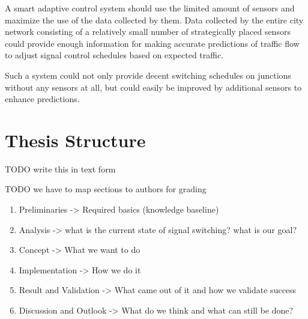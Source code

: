 A smart adaptive control system should use the limited amount of sensors and maximize the use of the data collected by them. Data collected by the entire city network consisting of a relatively small number of strategically placed sensors could provide enough information for making accurate predictions of traffic flow to adjust signal control schedules based on expected traffic.

Such a system could not only provide decent switching schedules on junctions without any sensors at all, but could easily be improved by additional sensors to enhance predictions.

\newpage

\section{Thesis Structure}

TODO write this in text form

TODO we have to map sections to authors for grading


\begin{enumerate}
	\item Preliminaries -> Required basics (knowledge baseline)
	\item Analysis -> what is the current state of signal switching? what is our goal?
	\item Concept -> What we want to do
	\item Implementation -> How we do it
	\item Result and Validation -> What came out of it and how we validate success
	\item Discussion and Outlook -> What do we think and what can still be done?
\end{enumerate}